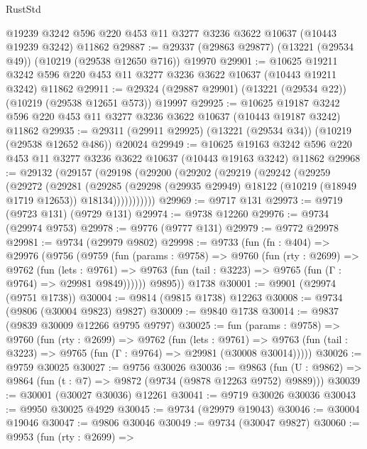 \begin{lexlean}{RustStd}
\begin{coremodule}
    @19239
    @3242
    @596
    @220
    @453
    @11
    @3277
    @3236
    @3622
    @10637
    (@10443 @19239 @3242)
    @11862
@29887 := @29337 (@29863 @29877) (@13221 (@29534 @49)) (@10219 (@29538 @12650 @716)) @19970
@29901 := @10625
    @19211
    @3242
    @596
    @220
    @453
    @11
    @3277
    @3236
    @3622
    @10637
    (@10443 @19211 @3242)
    @11862
@29911 := @29324 (@29887 @29901) (@13221 (@29534 @22)) (@10219 (@29538 @12651 @573)) @19997
@29925 := @10625
    @19187
    @3242
    @596
    @220
    @453
    @11
    @3277
    @3236
    @3622
    @10637
    (@10443 @19187 @3242)
    @11862
@29935 := @29311 (@29911 @29925) (@13221 (@29534 @34)) (@10219 (@29538 @12652 @486)) @20024
@29949 := @10625
    @19163
    @3242
    @596
    @220
    @453
    @11
    @3277
    @3236
    @3622
    @10637
    (@10443 @19163 @3242)
    @11862
@29968 := @29132
    (@29157
      (@29198
        (@29200
          (@29202
            (@29219
              (@29242
                (@29259
                  (@29272
                    (@29281
                      (@29285
                        (@29298
                          (@29935 @29949)
                          @18122
                          (@10219 (@18949 @1719 @12653))
                          @18134)))))))))))
@29969 := @9717 @131
@29973 := @9719 (@9723 @131) (@9729 @131)
@29974 := @9738 @12260
@29976 := @9734 (@29974 @9753)
@29978 := @9776 (@9777 @131)
@29979 := @9772 @29978
@29981 := @9734 (@29979 @9802)
@29998 := @9733
    (fun (fn : @404) =>
    @29976
      (@9756
        (@9759
          (fun (params : @9758) =>
          @9760
            (fun (rty : @2699) =>
            @9762
              (fun (lets : @9761) =>
              @9763 (fun (tail : @3223) => @9765 (fun (Γ : @9764) => @29981 @9849))))))
        @9895))
    @1738
@30001 := @9901 (@29974 (@9751 @1738))
@30004 := @9814 (@9815 @1738) @12263
@30008 := @9734 (@9806 (@30004 @9823) @9827)
@30009 := @9840 @1738
@30014 := @9837 (@9839 @30009 @12266 @9795 @9797)
@30025 := fun (params : @9758) =>
  @9760
    (fun (rty : @2699) =>
    @9762
      (fun (lets : @9761) =>
      @9763 (fun (tail : @3223) => @9765 (fun (Γ : @9764) => @29981 (@30008 @30014)))))
@30026 := @9759 @30025
@30027 := @9756 @30026
@30036 := @9863
    (fun (U : @9862) => @9864 (fun (t : @7) => @9872 (@9734 (@9878 @12263 @9752) @9889)))
@30039 := @30001 (@30027 @30036) @12261
@30041 := @9719 @30026 @30036
@30043 := @9950 @30025 @4929
@30045 := @9734 (@29979 @19043)
@30046 := @30004 @19046
@30047 := @9806 @30046
@30049 := @9734 (@30047 @9827)
@30060 := @9953
    (fun (rty : @2699) =>

\end{coremodule}
\end{lexlean}

